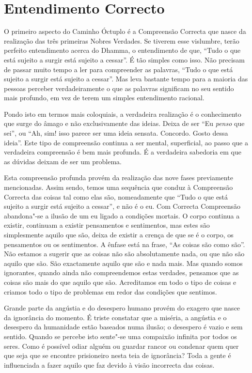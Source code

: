 \clearpage

\section{Entendimento Correcto}

O primeiro aspecto do Caminho Óctuplo é a Compreensão Correcta que nasce da
realização das três primeiras Nobres Verdades. Se tiverem esse vislumbre, terão
perfeito entendimento acerca do Dhamma, o entendimento de que, “Tudo o que está
sujeito a surgir está sujeito a cessar”. É tão simples como isso. Não precisam
de passar muito tempo a ler para compreender as palavras, “Tudo o que está
sujeito a surgir está sujeito a cessar”. Mas leva bastante tempo para a maioria
das pessoas perceber verdadeiramente o que as palavras significam no seu sentido
mais profundo, em vez de terem um simples entendimento racional.

Pondo isto em termos mais coloquiais, a verdadeira realização é o conhecimento
que surge do âmago e não exclusivamente das ideias. Deixa de ser “Eu
\emph{penso} que sei”, ou “Ah, sim! isso parece ser uma ideia sensata. Concordo.
Gosto dessa ideia”. Este tipo de compreensão continua a ser mental,
superficial, ao passo que a verdadeira compreensão é bem mais profunda. É a
verdadeira sabedoria em que as dúvidas deixam de ser um problema.

Esta compreensão profunda provém da realização das nove fases previamente
mencionadas. Assim sendo, temos uma sequência que conduz à Compreensão
Correcta das coisas tal como elas são, nomeadamente que “Tudo o que está sujeito
a surgir está sujeito a cessar”, e não é o eu. Com Correcta Compreensão
abandona"-se a ilusão de um eu ligado a condições mortais. O corpo continua a
existir, continuam a existir pensamentos e sentimentos, mas estes são
simplesmente aquilo que são, deixa de existir a crença de que se é o corpo, os
pensamentos ou os sentimentos. A ênfase está na frase, “As coisas são como são”.
Não estamos a sugerir que as coisas não são absolutamente nada, ou que não são
aquilo que são. São exactamente aquilo que são e nada mais. Mas quando somos
ignorantes, quando ainda não compreendemos estas verdades, pensamos que as
coisas são mais do que aquilo que são. Acreditamos em todo o tipo de coisas e
criamos todo o tipo de problemas em redor das condições que sentimos.

Grande parte da angústia e do desespero humano provém do exagero que nasce da
ignorância do momento. É triste constatar que a miséria, a angústia e o
desespero da humanidade estão baseados numa ilusão; o desespero é vazio e sem
sentido. Quando se percebe isto sente"-se uma compaixão infinita por todos os
seres. Como é possível odiar alguém ou guardar rancor ou condenar quem quer que
seja que se encontre prisioneiro nesta teia de ignorância? Toda a gente é
influenciada a fazer aquilo que faz devido à visão incorrecta das coisas.


